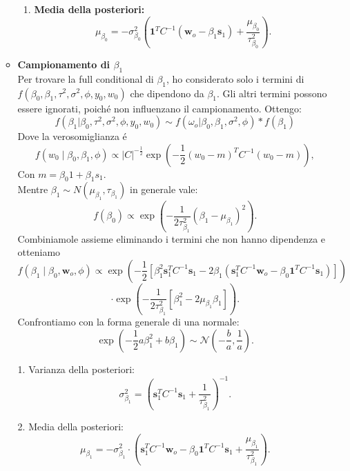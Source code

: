 \documentclass[a4paper,12pt]{article}
\begin{document}
\begin{itemize}
\begin{itemize}
\begin{enumerate}
				\item \textbf{Media della posteriori:}
				\[
				\mu_{\beta_0} = -\sigma_{\beta_0}^2 \left( \mathbf{1}^T C^{-1} (\mathbf{w}_o - \beta_1 \mathbf{s}_1) + \frac{\mu_{\beta_0}}{\tau_{\beta_0}^2} \right).
				\]
			\end{enumerate}
			\item \textbf{Campionamento di $\beta_1$}\\
			Per trovare la full conditional di \( \beta_1 \), ho considerato solo i termini di \( f(\beta_0,\beta_1,\tau^2,\sigma^2,\phi , y_0,w_0) \) che dipendono da \( \beta_1 \). Gli altri termini possono essere ignorati, poiché non influenzano il campionamento. Ottengo:
			\[
			f(\beta_1|\beta_0,\tau^2,\sigma^2,\phi , y_0,w_0) \sim f(\omega_o | \beta_0,\beta_1,\sigma^2,\phi)*f(\beta_1)
			\]
			Dove la verosomiglianza é
			\[
			f(w_0 \mid \beta_0, \beta_1, \phi) \propto |C|^{-\frac{1}{2}} \exp \left( -\frac{1}{2} (w_0 - m )^T C^{-1} (w_0 - m) \right),
			\]
			Con $m=\beta_0 1 + \beta_1 s_1$.\\
			Mentre $\beta_1 \sim N(\mu_{\beta_1},\tau_{\beta_1})$ in generale vale:
			\[
			f(\beta_0) \propto \exp \left( -\frac{1}{2\tau_{\beta_1}^2} (\beta_1 - \mu_{\beta_1})^2 \right).
			\]
			Combiniamole assieme eliminando i termini che non hanno dipendenza e otteniamo
			\[
			f(\beta_1 \mid \beta_0, \mathbf{w}_o, \phi) \propto \exp \left( 
			-\frac{1}{2} \left[ 
			\beta_1^2 \mathbf{s}_1^T C^{-1} \mathbf{s}_1 
			- 2\beta_1 \left( \mathbf{s}_1^T C^{-1} \mathbf{w}_o - \beta_0 \mathbf{1}^T C^{-1} \mathbf{s}_1 \right)
			\right] \right)
			\]
			\[
			\cdot \exp \left( 
			-\frac{1}{2\tau_{\beta_1}^2} \left[ 
			\beta_1^2 - 2\mu_{\beta_1} \beta_1
			\right] \right).
			\]
			Confrontiamo con la forma generale di una normale:
			\[
			\exp \left( -\frac{1}{2} a \beta_1^2 + b \beta_1 \right) \sim \mathcal{N} \left( -\frac{b}{a}, \frac{1}{a} \right).
			\]
			
			
			1. Varianza della posteriori:
			\[
			\sigma_{\beta_1}^2 = \left( \mathbf{s}_1^T C^{-1} \mathbf{s}_1 + \frac{1}{\tau_{\beta_1}^2} \right)^{-1}.
			\]
			
			2. Media della posteriori:
			\[
			\mu_{\beta_1} = -\sigma_{\beta_1}^2 \cdot \left( 
			\mathbf{s}_1^T C^{-1} \mathbf{w}_o - \beta_0 \mathbf{1}^T C^{-1} \mathbf{s}_1 + \frac{\mu_{\beta_1}}{\tau_{\beta_1}^2} 
			\right).
			\]
			

\end{itemize}
\end{itemize}
\end{document}
